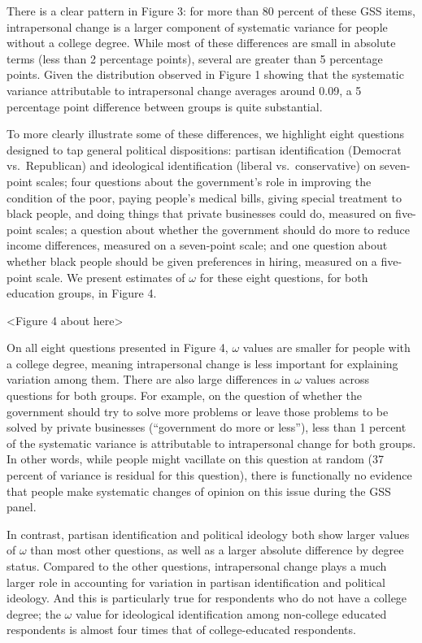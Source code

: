 \documentclass[
  11pt,
]{article}
\begin{document}
There is a clear pattern in Figure 3: for more than 80 percent of these
GSS items, intrapersonal change is a larger component of systematic
variance for people without a college degree. While most of these
differences are small in absolute terms (less than 2 percentage points),
several are greater than 5 percentage points. Given the distribution
observed in Figure 1 showing that the systematic variance attributable
to intrapersonal change averages around 0.09, a 5 percentage point
difference between groups is quite substantial.

To more clearly illustrate some of these differences, we highlight eight
questions designed to tap general political dispositions: partisan
identification (Democrat vs.~Republican) and ideological identification
(liberal vs.~conservative) on seven-point scales; four questions about
the government's role in improving the condition of the poor, paying
people's medical bills, giving special treatment to black people, and
doing things that private businesses could do, measured on five-point
scales; a question about whether the government should do more to reduce
income differences, measured on a seven-point scale; and one question
about whether black people should be given preferences in hiring,
measured on a five-point scale. We present estimates of \(\omega\) for
these eight questions, for both education groups, in Figure 4.

\begin{center}
<Figure 4 about here>
\end{center}

On all eight questions presented in Figure 4, \(\omega\) values are
smaller for people with a college degree, meaning intrapersonal change
is less important for explaining variation among them. There are also
large differences in \(\omega\) values across questions for both groups.
For example, on the question of whether the government should try to
solve more problems or leave those problems to be solved by private
businesses (``government do more or less''), less than 1 percent of the
systematic variance is attributable to intrapersonal change for both
groups. In other words, while people might vacillate on this question at
random (37 percent of variance is residual for this question), there is
functionally no evidence that people make systematic changes of opinion
on this issue during the GSS panel.

In contrast, partisan identification and political ideology both show
larger values of \(\omega\) than most other questions, as well as a
larger absolute difference by degree status. Compared to the other
questions, intrapersonal change plays a much larger role in accounting
for variation in partisan identification and political ideology. And
this is particularly true for respondents who do not have a college
degree; the \(\omega\) value for ideological identification among
non-college educated respondents is almost four times that of
college-educated respondents.
\end{document}
